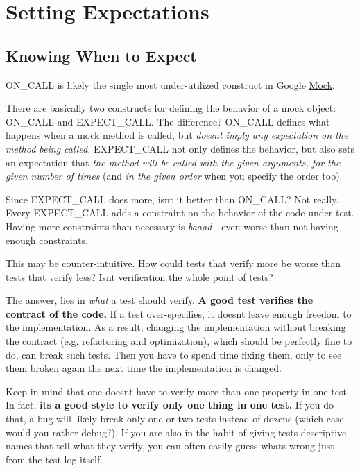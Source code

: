 \section*{Setting Expectations}

\subsection*{Knowing When to Expect}

{\ttfamily O\+N\+\_\+\+C\+A\+LL} is likely the single most under-\/utilized construct in Google \hyperlink{classMock}{Mock}.

There are basically two constructs for defining the behavior of a mock object\+: {\ttfamily O\+N\+\_\+\+C\+A\+LL} and {\ttfamily E\+X\+P\+E\+C\+T\+\_\+\+C\+A\+LL}. The difference? {\ttfamily O\+N\+\_\+\+C\+A\+LL} defines what happens when a mock method is called, but {\itshape doesn\textquotesingle{}t imply any expectation on the method being called.} {\ttfamily E\+X\+P\+E\+C\+T\+\_\+\+C\+A\+LL} not only defines the behavior, but also sets an expectation that {\itshape the method will be called with the given arguments, for the given number of times} (and {\itshape in the given order} when you specify the order too).

Since {\ttfamily E\+X\+P\+E\+C\+T\+\_\+\+C\+A\+LL} does more, isn\textquotesingle{}t it better than {\ttfamily O\+N\+\_\+\+C\+A\+LL}? Not really. Every {\ttfamily E\+X\+P\+E\+C\+T\+\_\+\+C\+A\+LL} adds a constraint on the behavior of the code under test. Having more constraints than necessary is {\itshape baaad} -\/ even worse than not having enough constraints.

This may be counter-\/intuitive. How could tests that verify more be worse than tests that verify less? Isn\textquotesingle{}t verification the whole point of tests?

The answer, lies in {\itshape what} a test should verify. {\bfseries A good test verifies the contract of the code.} If a test over-\/specifies, it doesn\textquotesingle{}t leave enough freedom to the implementation. As a result, changing the implementation without breaking the contract (e.\+g. refactoring and optimization), which should be perfectly fine to do, can break such tests. Then you have to spend time fixing them, only to see them broken again the next time the implementation is changed.

Keep in mind that one doesn\textquotesingle{}t have to verify more than one property in one test. In fact, {\bfseries it\textquotesingle{}s a good style to verify only one thing in one test.} If you do that, a bug will likely break only one or two tests instead of dozens (which case would you rather debug?). If you are also in the habit of giving tests descriptive names that tell what they verify, you can often easily guess what\textquotesingle{}s wrong just from the test log itself.

